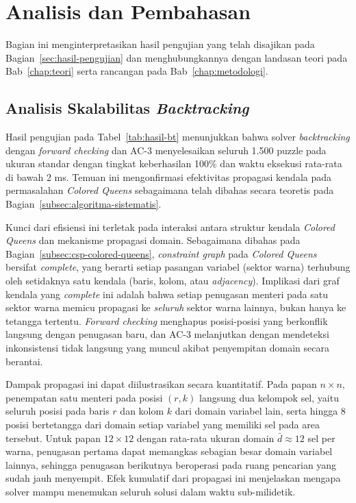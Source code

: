 \section{Analisis dan Pembahasan}
\label{sec:analisis}

Bagian ini menginterpretasikan hasil pengujian yang telah disajikan pada Bagian~\ref{sec:hasil-pengujian} dan menghubungkannya dengan landasan teori pada Bab~\ref{chap:teori} serta rancangan pada Bab~\ref{chap:metodologi}.

\subsection{Analisis Skalabilitas \textit{Backtracking}}
\label{subsec:analisis-backtracking}

Hasil pengujian pada Tabel~\ref{tab:hasil-bt} menunjukkan bahwa solver \textit{backtracking} dengan \textit{forward checking} dan AC-3 menyelesaikan seluruh 1.500 puzzle pada ukuran standar dengan tingkat keberhasilan 100\% dan waktu eksekusi rata-rata di bawah 2 ms. Temuan ini mengonfirmasi efektivitas propagasi kendala pada permasalahan \textit{Colored Queens} sebagaimana telah dibahas secara teoretis pada Bagian~\ref{subsec:algoritma-sistematis}.

Kunci dari efisiensi ini terletak pada interaksi antara struktur kendala \textit{Colored Queens} dan mekanisme propagasi domain. Sebagaimana dibahas pada Bagian~\ref{subsec:csp-colored-queens}, \textit{constraint graph} pada \textit{Colored Queens} bersifat \textit{complete}, yang berarti setiap pasangan variabel (sektor warna) terhubung oleh setidaknya satu kendala (baris, kolom, atau \textit{adjacency}). Implikasi dari graf kendala yang \textit{complete} ini adalah bahwa setiap penugasan menteri pada satu sektor warna memicu propagasi ke \textit{seluruh} sektor warna lainnya, bukan hanya ke tetangga tertentu. \textit{Forward checking} menghapus posisi-posisi yang berkonflik langsung dengan penugasan baru, dan AC-3 melanjutkan dengan mendeteksi inkonsistensi tidak langsung yang muncul akibat penyempitan domain secara berantai.

Dampak propagasi ini dapat diilustrasikan secara kuantitatif. Pada papan $n \times n$, penempatan satu menteri pada posisi $(r, k)$ langsung dua kelompok sel, yaitu seluruh posisi pada baris $r$ dan kolom $k$ dari domain variabel lain, serta hingga 8 posisi bertetangga dari domain setiap variabel yang memiliki sel pada area tersebut. Untuk papan $12 \times 12$ dengan rata-rata ukuran domain $\bar{d} \approx 12$ sel per warna, penugasan pertama dapat memangkas sebagian besar domain variabel lainnya, sehingga penugasan berikutnya beroperasi pada ruang pencarian yang sudah jauh menyempit. Efek kumulatif dari propagasi ini menjelaskan mengapa solver mampu menemukan seluruh solusi dalam waktu sub-milidetik.

